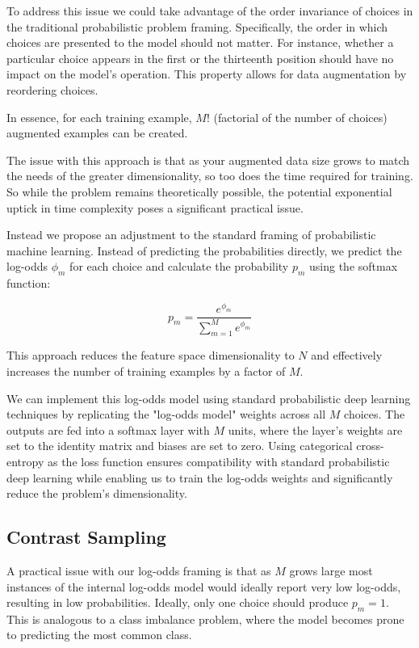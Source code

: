 \documentclass[11pt]{article}
\begin{document}
To address this issue we could take advantage of the order invariance of choices in the traditional probabilistic problem framing. Specifically, the order in which choices are presented to the model should not matter. For instance, whether a particular choice appears in the first or the thirteenth position should have no impact on the model's operation. This property allows for data augmentation by reordering choices.

In essence, for each training example, $M!$ (factorial of the number of choices) augmented examples can be created.

The issue with this approach is that as your augmented data size grows to match the needs of the greater dimensionality, so too does the time required for training. So while the problem remains theoretically possible, the potential exponential uptick in time complexity poses a significant practical issue. 


Instead we propose an adjustment to the standard framing of probabilistic machine learning. Instead of predicting the probabilities directly, we predict the log-odds $\phi_m$ for each choice and calculate the probability $p_m$ using the softmax function:

$$p_m = \frac{e^{\phi_m}}{\sum_{m=1}^{M}e^{\phi_m}}$$

This approach reduces the feature space dimensionality to $N$ and effectively increases the number of training examples by a factor of $M$.

We can implement this log-odds model using standard probabilistic deep learning techniques by replicating the "log-odds model" weights across all $M$ choices. The outputs are fed into a softmax layer with $M$ units, where the layer's weights are set to the identity matrix and biases are set to zero. Using categorical cross-entropy as the loss function ensures compatibility with standard probabilistic deep learning while enabling us to train the log-odds weights and significantly reduce the problem's dimensionality.

\subsection*{Contrast Sampling}

A practical issue with our log-odds framing is that as $M$ grows large most instances of the internal log-odds model would ideally report very low log-odds, resulting in low probabilities. Ideally, only one choice should produce $p_m=1$. This is analogous to a class imbalance problem, where the model becomes prone to predicting the most common class.
\end{document}
